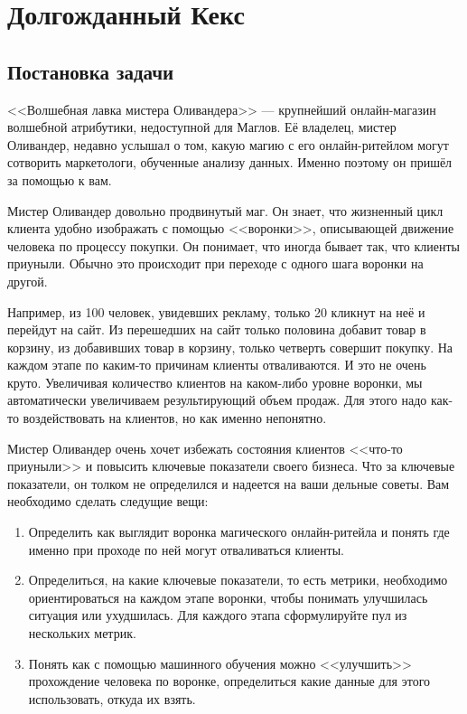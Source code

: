 \documentclass[12pt, a4paper, oneside]{article}
\begin{document}
\section*{Долгожданный Кекс}

\subsection*{Постановка задачи} 

<<Волшебная лавка мистера Оливандера>> --- крупнейший онлайн-магазин волшебной атрибутики, недоступной для Маглов.  Её владелец, мистер Оливандер, недавно услышал о том, какую магию с его онлайн-ритейлом могут сотворить маркетологи, обученные анализу данных. Именно поэтому он пришёл за помощью к вам. 

Мистер Оливандер довольно продвинутый маг. Он знает, что жизненный цикл клиента удобно изображать с помощью <<воронки>>, описывающей движение человека по процессу покупки.  Он понимает, что иногда бывает так, что клиенты приуныли. Обычно это происходит при переходе с одного шага воронки на другой. 

Например, из 100 человек, увидевших рекламу, только 20 кликнут на неё и перейдут на сайт. Из перешедших на сайт только половина добавит товар в корзину, из добавивших товар в корзину, только четверть совершит покупку. На каждом этапе по каким-то причинам клиенты отваливаются. И это не очень круто. Увеличивая количество клиентов на каком-либо уровне воронки, мы автоматически увеличиваем результирующий объем продаж. Для этого надо как-то воздействовать на клиентов, но как именно непонятно. 

Мистер Оливандер очень хочет избежать состояния клиентов <<что-то приуныли>> и повысить ключевые показатели своего бизнеса. Что за ключевые показатели, он толком не определился и надеется на ваши дельные советы. Вам необходимо сделать следущие вещи: 

\begin{enumerate}
	\item Определить как выглядит воронка магического онлайн-ритейла и понять где именно при проходе по ней могут отваливаться клиенты. 
	
	\item Определиться, на какие ключевые показатели, то есть метрики, необходимо ориентироваться на каждом этапе воронки, чтобы понимать улучшилась ситуация или ухудшилась. Для каждого этапа сформулируйте пул из нескольких метрик.
	
	\item Понять как с помощью машинного обучения можно <<улучшить>> прохождение человека по воронке, определиться какие данные для этого использовать, откуда их взять. 
\end{enumerate}
\end{document}

